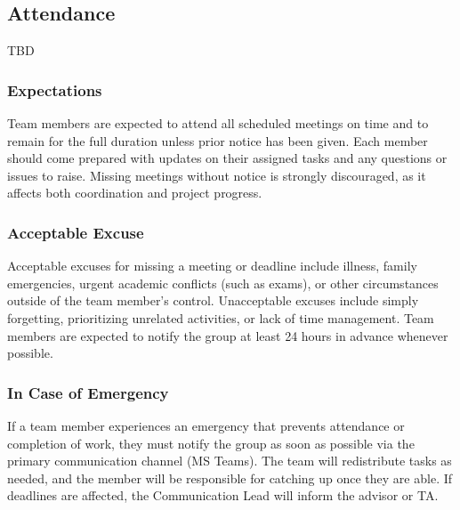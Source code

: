 \documentclass{article}
\begin{document}
\subsection*{Attendance}
{\color{red} TBD}

\subsubsection*{Expectations}

Team members are expected to attend all scheduled meetings on time and to remain for the full
duration unless prior notice has been given. Each member should come prepared with updates 
on their assigned tasks and any questions or issues to raise. Missing meetings without notice 
is strongly discouraged, as it affects both coordination and project progress.

\subsubsection*{Acceptable Excuse}
Acceptable excuses for missing a meeting or deadline include illness, family emergencies, 
urgent academic conflicts (such as exams), or other circumstances outside of the team 
member's control. Unacceptable excuses include simply forgetting, prioritizing unrelated 
activities, or lack of time management. Team members are expected to notify the group 
at least 24 hours in advance whenever possible.

\subsubsection*{In Case of Emergency}

If a team member experiences an emergency that prevents attendance or completion of work, 
they must notify the group as soon as possible via the primary communication channel (MS Teams). 
The team will redistribute tasks as needed, and the member will be responsible for catching up 
once they are able. If deadlines are affected, the Communication Lead will inform the advisor or TA.
\end{document}
